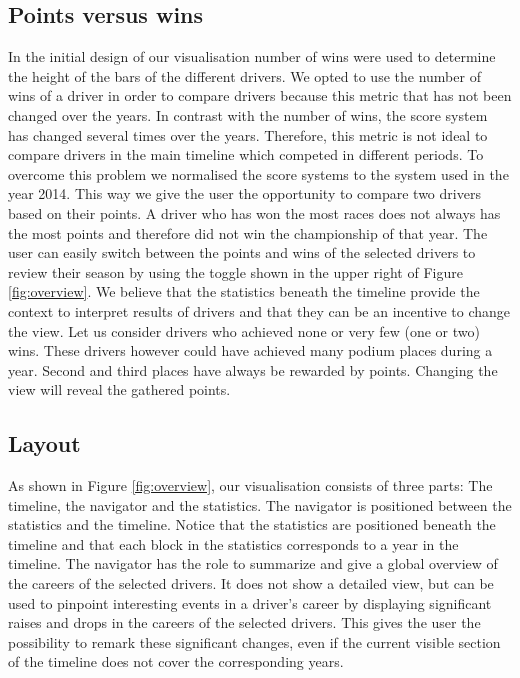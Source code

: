 \documentclass{sigchi}
\begin{document}
\subsection{Points versus wins} 

In the initial design of our visualisation number of wins were used to determine the height of the bars of the different drivers. We opted to use the number of wins of a driver in order to compare drivers because this metric that has not been changed over the years. In contrast with  the number of wins, the score system has changed several times over the years\cite{wikipoints}. Therefore, this metric is not ideal to compare drivers in the main timeline which competed in different periods. To overcome this problem we normalised the score systems to the system used in the year 2014. This way we give the user the opportunity to compare two drivers based on their points. A driver who has won the most races does not always has the most points and therefore did not win the championship of that year. The user can easily switch between the points and wins of the selected drivers to review their season by using the toggle shown in the upper right of Figure \ref{fig:overview}. We believe that the statistics beneath the timeline provide the context to interpret results of drivers and that they can be an incentive to change the view. Let us consider drivers who achieved none or very few (one or two) wins. These drivers however could have achieved many podium places during a year. Second and third places have always be rewarded by points. Changing the view will reveal the gathered points. 


\subsection{Layout} 
\label{layout}
As shown in Figure \ref{fig:overview}, our visualisation consists of three parts: The timeline, the navigator and the statistics. The navigator is positioned between the statistics and the timeline. Notice that the statistics are positioned beneath the timeline and that each block in the statistics corresponds to a year in the timeline. 
The navigator has the role to summarize and give a global overview of the careers of the selected drivers. It does not show a detailed view, but can be used to pinpoint interesting events in a driver’s career by displaying significant raises and drops in the careers of the selected drivers. This gives the user the possibility to remark these significant changes, even if the current visible section of the timeline does not cover the corresponding years.
\end{document}
